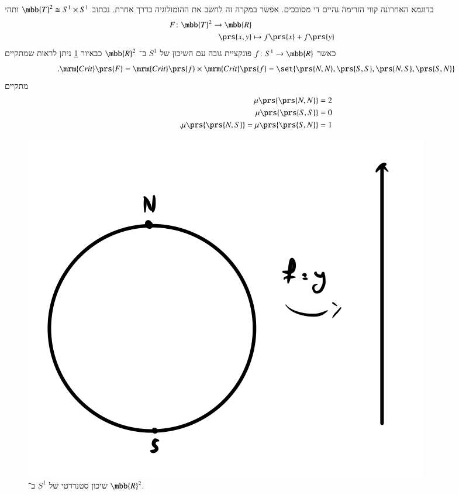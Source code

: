 \documentclass[a4paper,10pt,twoside,openany]{book}
\begin{document}
\begin{example}
בדוגמא האחרונה קווי הזרימה נהיים די מסובכים. אפשר במקרה זה לחשב את ההומולוגיה בדרך אחרת.
נכתוב
$\mbb{T}^2 \cong S^1 \times S^1$
ותהי
\begin{align*}
F \colon \mbb{T}^2 \to \mbb{R} \\
\prs{x,y} &\mapsto f\prs{x} + f\prs{y}
\end{align*}
כאשר
$f \colon S^1 \to \mbb{R}$
פונקציית גובה עם השיכון של
$S^1$
ב־%
$\mbb{R}^2$
כבאיור
\ref{5.4}
ניתן לראות שמתקיים
\[\text{.} \mrm{Crit}\prs{F} = \mrm{Crit}\prs{f} \times \mrm{Crit}\prs{f} = \set{\prs{N,N}, \prs{S,S}, \prs{N,S}, \prs{S,N}}\]
מתקיים
\begin{align*}
\mu\prs{\prs{N,N}} &= 2 \\
\mu\prs{\prs{S,S}} &= 0 \\
\text{.} \mu\prs{\prs{N,S}} = \mu\prs{\prs{S,N}} &= 1
\end{align*}

\begin{figure}
\centering
\includegraphics[scale=0.5]{sources/5.4}
\caption{שיכון סטנדרטי של
$S^1$
ב־%
$\mbb{R}^2$.}
\label{5.4}
\end{figure}


\end{example}
\end{document}
